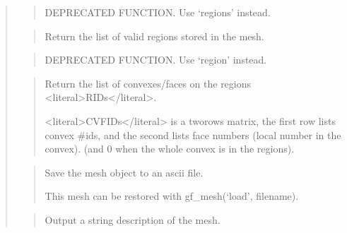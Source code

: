 \documentclass[a4paper,11pt,english]{sphinxmanual}
\begin{document}
\begin{quote}
\begin{quote}
\sphinxAtStartPar
DEPRECATED FUNCTION. Use ‘regions’ instead.
\end{quote}

\sphinxAtStartPar
{}
\begin{quote}

\sphinxAtStartPar
Return the list of valid regions stored in the mesh.
\end{quote}

\sphinxAtStartPar
{}
\begin{quote}

\sphinxAtStartPar
DEPRECATED FUNCTION. Use ‘region’ instead.
\end{quote}

\sphinxAtStartPar
{}
\begin{quote}

\sphinxAtStartPar
Return the list of convexes/faces on the regions \textless{}literal\textgreater{}RIDs\textless{}/literal\textgreater{}.

\sphinxAtStartPar
\textless{}literal\textgreater{}CVFIDs\textless{}/literal\textgreater{} is a two\sphinxhyphen{}rows matrix, the first row lists convex \#ids,
and the second lists face numbers (local number in the convex).
(and 0 when the whole convex is in the
regions).
\end{quote}

\sphinxAtStartPar
{}
\begin{quote}

\sphinxAtStartPar
Save the mesh object to an ascii file.

\sphinxAtStartPar
This mesh can be restored with gf\_mesh(‘load’, filename).
\end{quote}

\sphinxAtStartPar
{}
\begin{quote}

\sphinxAtStartPar
Output a string description of the mesh.
\end{quote}

\sphinxAtStartPar
{}
\begin{quote}


\end{quote}
\end{quote}
\end{document}
